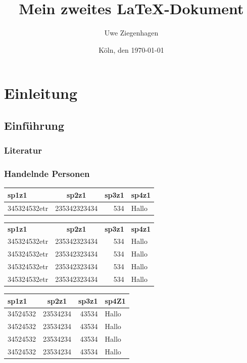 \documentclass[ngerman]{scrreprt}
\author{Uwe Ziegenhagen}
\title{Mein zweites \LaTeX-Dokument}
\date{Köln, den \today}
\begin{document}
\maketitle

\tableofcontents

\listoftables

\listoffigures

\chapter{Einleitung}
\section{Einführung}
\subsection{Literatur}
\subsection{Handelnde Personen}

\blindtext

\label{tab:erstetab}
\begin{tabular}{|l|c|r|p{8cm}|} \hline
sp1z1 & sp2z1 & sp3z1 & sp4z1 \\ \hline
345324532etr  & 235342323434 & 534 & Hallo  \\ \hline
\end{tabular}


\begin{center}
\label{tab:erstebooktab}
\begin{tabular}{lcrp{4cm}} \toprule[2.5pt]
\textbf{sp1z1} & \textbf{sp2z1} & \textbf{sp3z1} & \textbf{sp4z1} \\ \addlinespace \cmidrule(rl){1-3}
345324532etr  & 235342323434 & 534 & Hallo  \\ 
345324532etr  & 235342323434 & 534 & Hallo  \\ 
345324532etr  & 235342323434 & 534 & Hallo  \\ 
345324532etr  & 235342323434 & 534 & Hallo  \\ \bottomrule[5pt]
\end{tabular}
\end{center}


\clearpage

\begin{center}
\label{tab:ertsebooktab}
\begin{tabular}{lcrp{2cm}}\toprule
\textbf{sp1z1} & \textbf{sp2z1} & \textbf{sp3z1} & \textbf{sp4Z1} \\ \midrule
34524532 & 23534234 & 43534 & Hallo\\
34524532 & 23534234 & 43534 & Hallo\\
34524532 & 23534234 & 43534 & Hallo\\
34524532 & 23534234 & 43534 & Hallo\\
\bottomrule
\end{tabular}
\end{center}
\end{document}
